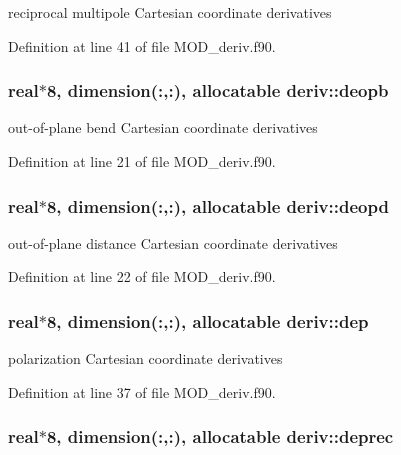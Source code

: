 reciprocal multipole Cartesian coordinate derivatives 



Definition at line 41 of file M\-O\-D\-\_\-deriv.\-f90.

\hypertarget{classderiv_a9c79f676fc042450c0d757ca7fcc90d4}{
\subsubsection[{deopb}]{\setlength{\rightskip}{0pt plus 5cm}real$\ast$8, dimension(\-:,\-:), allocatable deriv\-::deopb}}\label{classderiv_a9c79f676fc042450c0d757ca7fcc90d4}


out-\/of-\/plane bend Cartesian coordinate derivatives 



Definition at line 21 of file M\-O\-D\-\_\-deriv.\-f90.

\hypertarget{classderiv_aa8eae10f8664832413974a490f939ebb}{
\subsubsection[{deopd}]{\setlength{\rightskip}{0pt plus 5cm}real$\ast$8, dimension(\-:,\-:), allocatable deriv\-::deopd}}\label{classderiv_aa8eae10f8664832413974a490f939ebb}


out-\/of-\/plane distance Cartesian coordinate derivatives 



Definition at line 22 of file M\-O\-D\-\_\-deriv.\-f90.

\hypertarget{classderiv_a3d8bf98f85539e47c4fda4f9d0fd9d13}{
\subsubsection[{dep}]{\setlength{\rightskip}{0pt plus 5cm}real$\ast$8, dimension(\-:,\-:), allocatable deriv\-::dep}}\label{classderiv_a3d8bf98f85539e47c4fda4f9d0fd9d13}


polarization Cartesian coordinate derivatives 



Definition at line 37 of file M\-O\-D\-\_\-deriv.\-f90.

\hypertarget{classderiv_ab2d4c03ab52a5e5facc97ac8cf9abac7}{
\subsubsection[{deprec}]{\setlength{\rightskip}{0pt plus 5cm}real$\ast$8, dimension(\-:,\-:), allocatable deriv\-::deprec}}\label{classderiv_ab2d4c03ab52a5e5facc97ac8cf9abac7}


